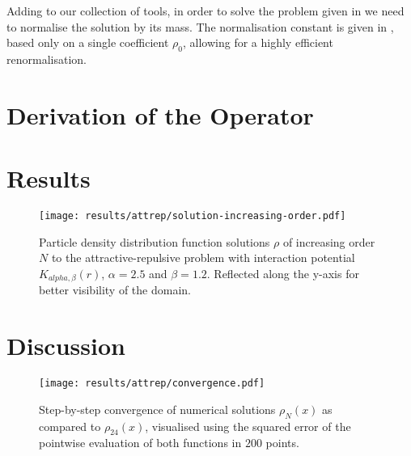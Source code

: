 



Adding to our collection of tools, in order to solve the problem given in  we need to normalise the solution by its mass.
The normalisation constant is given in , based only on a single coefficient $\rho_0$, allowing for a highly efficient renormalisation.


\pagebreak
\section{Derivation of the Operator}




\pagebreak


\section{Results}
\begin{figure}[H]
  \centering
  \texttt{[image: results/attrep/solution-increasing-order.pdf]}
  \caption[Solutions of increasing orders]{Particle density distribution function solutions $\rho$ of increasing order $N$ to the attractive-repulsive problem with interaction potential $K_{alpha, \beta}(r)$, $\alpha = 2.5$ and $\beta = 1.2$. Reflected along the y-axis for better visibility of the domain.}
  \label{fig:solution-increasing-order}
\end{figure}





\section{Discussion}
\begin{figure}[H]
  \centering
  \texttt{[image: results/attrep/convergence.pdf]}
  \caption[Step-by-step convergence of solutions compared to order 24]{Step-by-step convergence of numerical solutions $\rho_N(x)$ as compared to $\rho_{24}(x)$, visualised using the squared error of the pointwise evaluation of both functions in $200$ points.}
  \label{fig:convergence}
\end{figure}

